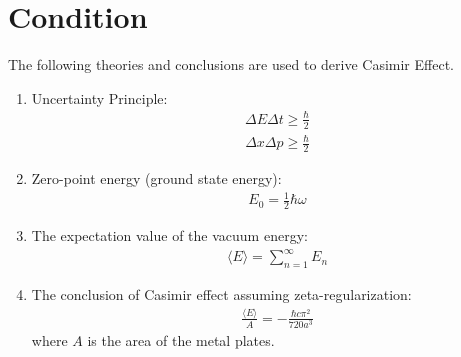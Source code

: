 \section{Condition}
The following theories and conclusions are used to derive Casimir Effect.
\begin{enumerate}
    \item Uncertainty Principle:
        \begin{align}&\Delta E \Delta t \ge \frac{\hbar}{2}\end{align}
        \begin{align}&\Delta x \Delta p \ge \frac{\hbar}{2}\end{align}
    \item Zero-point energy (ground state energy): \begin{align}&E_0 = \frac{1}{2}\hbar\omega\end{align}
    \item The expectation value of the vacuum energy: \begin{align}&\langle E \rangle = \sum_{n=1}^{\infty} E_n\end{align}
    \item The conclusion of Casimir effect assuming zeta-regularization: 
    \begin{align}&\frac{\langle E \rangle}{A} = -\frac{\hbar c \pi^2}{720 a^3}\end{align}
    where \(A\) is the area of the metal plates.
\end{enumerate}

